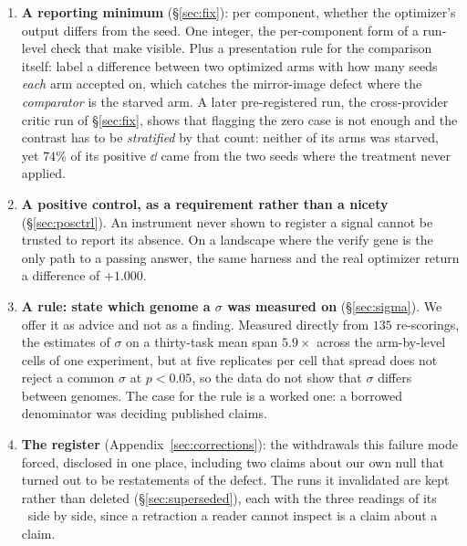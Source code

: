 \documentclass[11pt]{article}
\begin{document}
\begin{enumerate}
    number; an empty LLM completion accepted as a gene deletes that step of the loop, which
    \emph{improves} the training score whenever the deleted step is worse than useless; a sampling
    flag reached one of three sampled surfaces while the metadata recorded it as set; and a pooled
    variance estimator screened every dimension of its regime except which model produced the
    draws.
  \item \textbf{A reporting minimum} (\S\ref{sec:fix}): per component, whether the optimizer's
    output differs from the seed. One integer, the per-component form of a run-level check that
    \citet{li2026teb} make visible. Plus a presentation rule for the comparison itself:
    label a difference between two optimized arms with how many seeds \emph{each} arm accepted
    on, which catches the mirror-image defect where the \emph{comparator} is the starved arm.
    A later pre-registered run, the cross-provider critic run of \S\ref{sec:fix}, shows that flagging the zero case is not enough and the contrast
    has to be \emph{stratified} by that count: neither of its arms was starved, yet $74\%$ of its
    positive $\dd$ came from the two seeds where the treatment never applied.
  \item \textbf{A positive control, as a requirement rather than a nicety}
    (\S\ref{sec:posctrl}). An instrument never shown to register a signal cannot be trusted to
    report its absence. On a landscape where the verify gene is the only path to a passing answer,
    the same harness and the real optimizer return a difference of $+1.000$.
  \item \textbf{A rule: state which genome a $\sigma$ was measured on} (\S\ref{sec:sigma}). We
    offer it as advice and not as a finding. Measured directly from $135$ re-scorings, the
    estimates of $\sigma$ on a thirty-task mean span $5.9\times$ across the arm-by-level cells of
    one experiment, but at five replicates per cell that spread does not reject a common $\sigma$
    at $p<0.05$, so the data do not show that $\sigma$ differs between genomes. The case for the
    rule is a worked one: a borrowed denominator was deciding published claims.
  \item \textbf{The register} (Appendix~\ref{sec:corrections}): the withdrawals this failure mode forced,
    disclosed in one place, including two claims about our own null that turned out to be
    restatements of the defect. The runs it invalidated are kept rather than deleted
    (\S\ref{sec:superseded}), each with the three readings of its \dd\ side by side, since a
    retraction a reader cannot inspect is a claim about a claim.
\end{enumerate}
\end{document}
